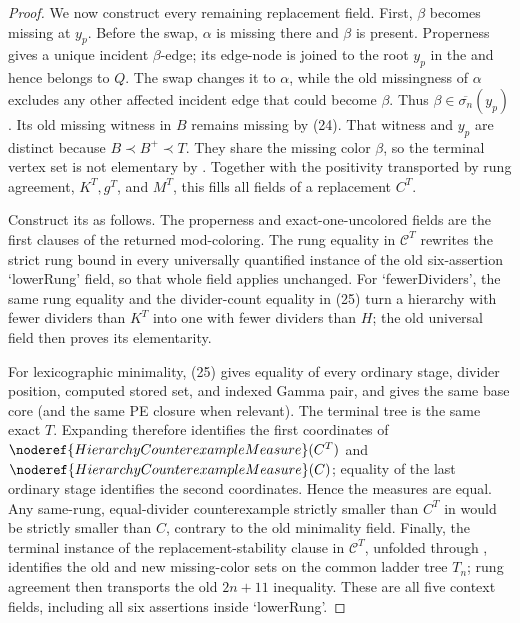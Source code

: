 \begin{proof}
We now construct every remaining replacement field.  First, \(\beta\)
becomes missing at \(y_p\).  Before the swap, \(\alpha\) is missing there
and \(\beta\) is present.  Properness gives a unique incident
\(\beta\)-edge; its edge-node is joined to the root \(y_p\) in the
 and hence belongs to \(Q\).  The swap changes it
to \(\alpha\), while the old missingness of \(\alpha\) excludes any other
affected incident edge that could become \(\beta\).  Thus
\(\beta\in\overline{\sigma_n}(y_p)\).  Its old missing witness in \(B\)
remains missing by (24).  That witness and \(y_p\) are distinct because
\(B\prec B^+\prec T\).  They share the missing color \(\beta\), so the
terminal vertex set is not elementary by
.  Together with the positivity
transported by rung agreement, \(K^T,g^T\), and \(M^T\), this fills all
fields of a replacement  \(C^T\).

Construct its  as follows.
The properness and exact-one-uncolored fields are the first clauses of the
returned mod-coloring.  The rung equality in \(\mathcal C^T\) rewrites the
strict rung bound in every universally quantified instance of the old
six-assertion `lowerRung' field, so that whole field applies unchanged.
For `fewerDividers', the same rung equality and the divider-count equality
in (25) turn a hierarchy with fewer dividers than \(K^T\) into one with
fewer dividers than \(H\); the old universal field then proves its
elementarity.

For lexicographic minimality, (25) gives equality of every ordinary stage,
divider position, computed stored set, and indexed Gamma pair, and gives
the same base core (and the same PE closure when relevant).  The terminal
tree is the same exact \(T\).  Expanding 
therefore identifies the first coordinates of
\(\noderef{HierarchyCounterexampleMeasure}(C^T)\) and
\(\noderef{HierarchyCounterexampleMeasure}(C)\); equality of the last
ordinary stage identifies the second coordinates.  Hence the measures are
equal.  Any same-rung, equal-divider counterexample strictly smaller than
\(C^T\) in  would be strictly smaller
than \(C\), contrary to the old minimality field.  Finally, the terminal
instance of the replacement-stability clause in \(\mathcal C^T\), unfolded
through , identifies the old and new missing-color
sets on the common ladder tree \(T_n\); rung agreement then transports the
old \(2n+11\) inequality.  These are all five context fields, including
all six assertions inside `lowerRung'.


\end{proof}
